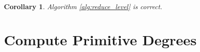 \documentclass[11pt,reqno]{amsart}
\theoremstyle{plain}
\newtheorem{corollary}[theorem]{Corollary}
\theoremstyle{definition}
\newcommand{\Z}{\bZ}
\newcommand{\abbey}[1]{\textcolor{blue}{Abbey: #1}}
\newcommand{\sachi}[1]{\textcolor{purple}{Sachi: #1}}
\newcommand{\travis}[1]{\textcolor{orange}{Travis: #1}}
\begin{document}
  \begin{corollary}
  Algorithm \ref{alg:reduce_level} is correct.
  \end{corollary}





\section{Compute Primitive Degrees}
\label{sec:primitivedeg}
\end{document}
